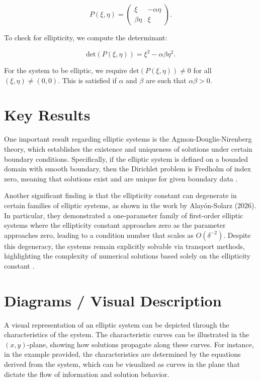 \documentclass[11pt,a4paper]{article}
\begin{document}
\begin{equation}
P(\xi, \eta) = \begin{pmatrix}
\xi & -\alpha \eta \\
\beta \eta & \xi
\end{pmatrix}.
\end{equation}

To check for ellipticity, we compute the determinant:

\begin{equation}
\text{det}(P(\xi, \eta)) = \xi^2 - \alpha \beta \eta^2.
\end{equation}

For the system to be elliptic, we require \( \text{det}(P(\xi, \eta)) \neq 0 \) for all \( (\xi, \eta) \neq (0, 0) \). This is satisfied if \( \alpha \) and \( \beta \) are such that \( \alpha \beta > 0 \).

\section{Key Results}
One important result regarding elliptic systems is the Agmon-Douglis-Nirenberg theory, which establishes the existence and uniqueness of solutions under certain boundary conditions. Specifically, if the elliptic system is defined on a bounded domain with smooth boundary, then the Dirichlet problem is Fredholm of index zero, meaning that solutions exist and are unique for given boundary data \cite{arxiv:2601.19274}.

Another significant finding is that the ellipticity constant can degenerate in certain families of elliptic systems, as shown in the work by Alayón-Solarz (2026). In particular, they demonstrated a one-parameter family of first-order elliptic systems where the ellipticity constant approaches zero as the parameter approaches zero, leading to a condition number that scales as \( O(\delta^{-2}) \). Despite this degeneracy, the systems remain explicitly solvable via transport methods, highlighting the complexity of numerical solutions based solely on the ellipticity constant \cite{arxiv:2602.15479}.

\section{Diagrams / Visual Description}
A visual representation of an elliptic system can be depicted through the characteristics of the system. The characteristic curves can be illustrated in the \( (x, y) \)-plane, showing how solutions propagate along these curves. For instance, in the example provided, the characteristics are determined by the equations derived from the system, which can be visualized as curves in the plane that dictate the flow of information and solution behavior.
\end{document}

